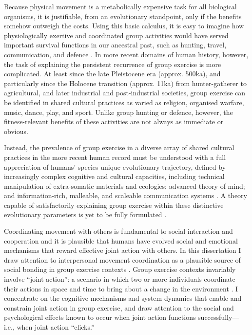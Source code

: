 \begin{CJK}{UTF8}{gbsn}

Because physical movement is a metabolically expensive task for all biological organisms, it is justifiable, from an evolutionary standpoint, only if the benefits somehow outweigh the costs.  Using this basic calculus, it is easy to imagine how physiologically exertive and coordinated group activities would have served important survival functions in our ancestral past, such as hunting, travel, communication, and defence \citep{Sands2010}.  In more recent domains of human history, however, the task of explaining the persistent recurrence of group exercise is more complicated.  At least since the late Pleistocene era (approx. 500ka), and particularly since the Holocene transition (approx. 11ka) from hunter-gatherer to agricultural, and later industrial and post-industrial societies, group exercise can be identified in shared cultural practices as varied as religion, organised warfare, music, dance, play, and sport.  Unlike group hunting or defence, however, the fitness-relevant benefits of these activities are not always as immediate or obvious.

Instead, the prevalence of group exercise in a diverse array of shared cultural practices in the more recent human record must be understood with a full appreciation of humans' species-unique evolutionary trajectory, defined by increasingly complex cognitive and cultural capacities, including technical manipulation of extra-somatic materials and ecologies; advanced theory of mind; and information-rich, malleable, and scaleable communication systems \citep{Fuentes2016}.  A theory capable of satisfactorily explaining group exercise within these distinctive evolutionary parameters is yet to be fully formulated \citep{Cohen2017}.

Coordinating movement with others is fundamental to social interaction and cooperation and it is plausible that humans have evolved social and emotional mechanisms that reward effective joint action with others.  In this dissertation I draw attention to interpersonal movement coordination as a plausible source of social bonding in group exercise contexts \citep{Marsh2009}.  Group exercise contexts invariably involve ``joint action'': a scenario in which two or more individuals coordinate their actions in space and time to bring about a change in the environment \citep{Sebanz2006}.  I concentrate on the cognitive mechanisms and system dynamics that enable and constrain joint action in group exercise, and draw attention to the social and psychological effects known to occur when joint action functions successfully---i.e., when joint action ``clicks.''


\end{CJK}
